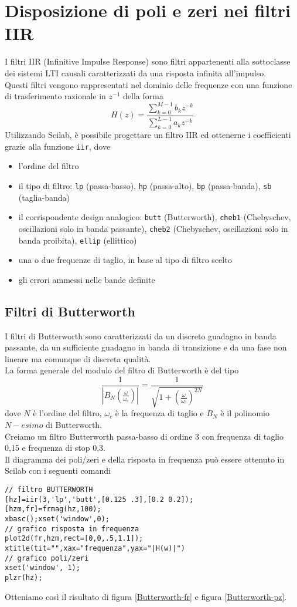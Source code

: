 \chapter{Disposizione di poli e zeri nei filtri IIR}
I filtri IIR (Infinitive Impulse Response) sono filtri appartenenti alla sottoclasse dei sistemi LTI causali caratterizzati da una risposta infinita all'impulso.\\
Questi filtri vengono rappresentati nel dominio delle frequenze con una funzione di trasferimento razionale in $z^{-1}$ della forma
\begin{displaymath}
H(z)=\frac{\sum_{k=0}^{M-1} b_kz^{-k}}{\sum_{k=0}^{L-1} a_kz^{-k}}
\end{displaymath}
Utilizzando Scilab, \`e possibile progettare un filtro IIR ed ottenerne i coefficienti grazie alla funzione \verb+iir+, dove
\begin{itemize}
\item l'ordine del filtro
\item il tipo di filtro: \verb+lp+ (passa-basso), \verb+hp+ (passa-alto), \verb+bp+ (passa-banda), \verb+sb+ (taglia-banda)
\item il corrispondente design analogico: \verb+butt+ (Butterworth), \verb+cheb1+ (Chebyschev, oscillazioni solo in banda passante), \verb+cheb2+ (Chebyschev, oscillazioni solo in banda proibita), \verb+ellip+ (ellittico)
\item una o due frequenze di taglio, in base al tipo di filtro scelto
\item gli errori ammessi nelle bande definite
\end{itemize}

\section{Filtri di Butterworth}
I filtri di Butterworth sono caratterizzati da un discreto guadagno in banda passante, da un sufficiente guadagno in banda di transizione e da una fase non lineare ma comunque di discreta qualit\`a.\\
La forma generale del modulo del filtro di Butterworth \`e del tipo
\begin{displaymath}
\frac{1}{\left|B_N \left(\frac{\omega}{\omega_c}\right)\right|}=\frac{1}{\sqrt{1+\left(\frac{\omega}{\omega_c}\right)^{2N}}}
\end{displaymath}
dove $N$ \`e l'ordine del filtro, $\omega_c$ \`e la frequenza di taglio e $B_N$ \`e il polinomio $N-esimo$ di Butterworth.\\
Creiamo un filtro Butterworth passa-basso di ordine 3 con frequenza di taglio 0,15 e frequenza di stop 0,3.\\
Il diagramma dei poli/zeri e della risposta in frequenza pu\`o essere ottenuto in Scilab con i seguenti comandi
\begin{verbatim}
// filtro BUTTERWORTH
[hz]=iir(3,'lp','butt',[0.125 .3],[0.2 0.2]);
[hzm,fr]=frmag(hz,100);
xbasc();xset('window',0);
// grafico risposta in frequenza
plot2d(fr,hzm,rect=[0,0,.5,1.1]);
xtitle(tit="",xax="frequenza",yax="|H(w)|")
// grafico poli/zeri
xset('window', 1);
plzr(hz);
\end{verbatim}
Otteniamo cos\`i il risultato di figura \ref{Butterworth-fr} e figura \ref{Butterworth-pz}.

